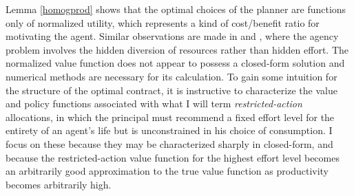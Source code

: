 \documentclass[11pt]{article}
\theoremstyle{plain}
\begin{document}
Lemma \ref{homogprod} shows that the optimal choices of the planner are functions only of normalized utility, which represents a kind of cost/benefit ratio for motivating the agent. Similar observations are made in \cite{ai_quantitative_2022} and \cite{he_optimal_2009}, where the agency problem involves the hidden diversion of resources rather than hidden effort. The normalized value function does not appear to possess a closed-form solution and numerical methods are necessary for its calculation. To gain some intuition for the structure of the optimal contract, it is instructive to characterize the value and policy functions associated with what I will term \textit{restricted-action} allocations, in which the principal must recommend a fixed effort level for the entirety of an agent's life but is unconstrained in his choice of consumption. I focus on these because they may be characterized sharply in closed-form, and because the restricted-action value function for the highest effort level becomes an arbitrarily good approximation to the true value function as productivity becomes arbitrarily high. 
\end{document}
